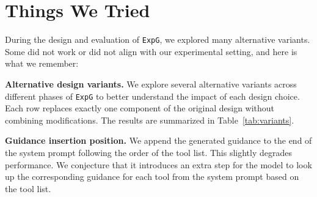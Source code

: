 \documentclass[11pt]{article}
\newcommand{\ours}{\texttt{ExpG}}
\begin{document}
\section{Things We Tried}\label{app:variants}



During the design and evaluation of {\ours}, we explored many alternative variants. Some did not work or did not align with our experimental setting, and here is what we remember:


\textbf{Alternative design variants.}
We explore several alternative variants across different phases of {\ours} to better understand the impact of each design choice. Each row replaces exactly one component of the original design without combining modifications. The results are summarized in Table~\ref{tab:variants}.

\textbf{Guidance insertion position.}
We append the generated guidance to the end of the system prompt following the order of the tool list. This slightly degrades performance. We conjecture that it introduces an extra step for the model to look up the corresponding guidance for each tool from the system prompt based on the tool list.
\end{document}
